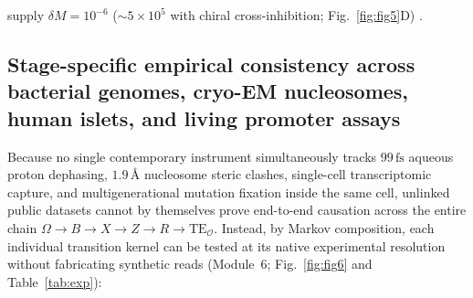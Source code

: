 \documentclass[10pt,letterpaper]{article}
\theoremstyle{plain}
\theoremstyle{definition}
\begin{document}
supply $\delta M = 10^{-6}$ ($\sim 5 \times 10^5$ with chiral cross-inhibition; Fig.~\ref{fig:fig5}D) \cite{globus2020apjl,ozturk2022pnas}.

\subsection*{Stage-specific empirical consistency across bacterial genomes, cryo-EM nucleosomes, human islets, and living promoter assays}

Because no single contemporary instrument simultaneously tracks $99\,\mathrm{fs}$ aqueous proton dephasing, $1.9\,\text{\AA}$ nucleosome steric clashes, single-cell transcriptomic capture, and multigenerational mutation fixation inside the same cell, unlinked public datasets cannot by themselves prove end-to-end causation across the entire chain $\Omega \to B \to X \to Z \to R \to \mathrm{TE}_{\mathcal{O}}$. Instead, by Markov composition, each individual transition kernel can be tested at its native experimental resolution without fabricating synthetic reads (Module~6; Fig.~\ref{fig:fig6} and Table~\ref{tab:exp}):
\end{document}
